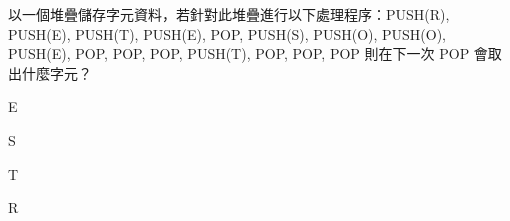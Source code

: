 \ifx\ntpcNinetyTwo\undefined[92學年基北區] \fi
以一個堆疊儲存字元資料，若針對此堆疊進行以下處理程序：PUSH(R), PUSH(E), PUSH(T), PUSH(E), POP, PUSH(S), PUSH(O), PUSH(O), PUSH(E), POP, POP, POP, PUSH(T), POP, POP, POP 則在下一次 POP 會取出什麼字元？
  \begin{optionlist}
  \item E\label{ntpc-92-a46}
  \item S
  \item T
  \item R
  \end{optionlist}